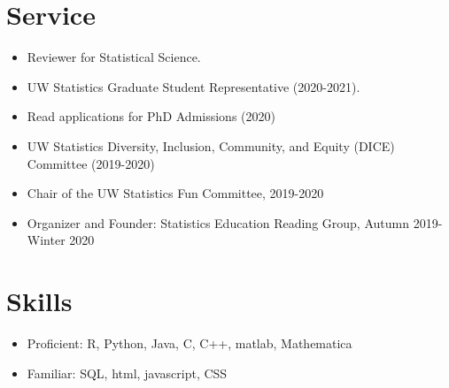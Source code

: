 \documentclass[margin, 10pt]{res} %
\begin{document}
\begin{resume}
{\section{Service}
\begin{itemize}
\item Reviewer for Statistical Science.
      \item UW Statistics Graduate Student Representative (2020-2021). 
    \item Read applications for PhD Admissions (2020) 
    \item UW Statistics Diversity, Inclusion, Community, and Equity (DICE) Committee (2019-2020)
    \item Chair of the UW Statistics Fun Committee, 2019-2020
    \item Organizer and Founder: Statistics Education Reading Group, Autumn 2019-Winter 2020
   \end{itemize}


\section{Skills}
\begin{itemize}
\item Proficient: R, Python, Java, C, C++, matlab, Mathematica
\item Familiar: SQL, html, javascript, CSS%
\end{itemize}


}
\end{resume}
\end{document}
